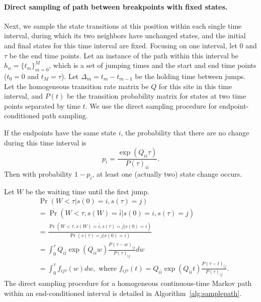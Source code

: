 \documentclass[11pt]{article}
\begin{document}
\paragraph{Direct sampling of path between breakpoints with fixed states.}
Next, we sample the state transitions at this position within each
single time interval, during which its two neighbors have unchanged
states, and the initial and final states for this time interval are
fixed.  Focusing on one interval, let $0$ and $\tau$ be the end time
points.  Let an instance of the path within this interval be $h_n=
\{t_m\}_{m=0}^{M}$, which is a set of jumping times and the start and
end time points ($t_0 = 0$ and $t_M=\tau$). Let $\Delta_m = t_m -
t_{m-1}$ be the holding time between jumps. Let the homogeneous
transition rate matrix be $Q$ for this site in this time interval, and
$P(t)$ be the transition probability matrix for states at two time
points separated by time $t$. We use the direct sampling procedure
\cite{hobolth2009simulation} for endpoint-conditioned path sampling.

If the endpoints have the same state $i$, the probability that there
are no change during this time interval is
\begin{equation} \label{eqn:pnojump}
p_i = \frac{\exp(Q_{ii}\tau)}{P(\tau)_{ii}}.
\end{equation}
Then with probability $1-p_i$, at least one (actually two) state change occurs.

Let $W$ be the waiting time until the first jump.
\begin{equation}
\begin{aligned}
& \Pr(W < \tau | s(0) = i, s(\tau) = j)  \\
& =  \Pr(W < \tau, s(W) = \bar{i} | s(0) = i, s(\tau) = j)\\
& = \frac{\Pr(W < \tau, s(W) = \bar{i},s(\tau) = j | s(0) = i) } {\Pr(s(\tau) = j | s(0) = i)}  \\
& = \int_{0}^{\tau} Q_{i\bar{i}} \exp(Q_{ii}w) \frac{P(\tau-w)_{\bar{i}j}}{P(\tau)_{ij}} dw \\
& = \int_{0}^{\tau} f_{ij\tau}(w) dw, \text{~where~}
f_{ij\tau}(t) = Q_{i\bar{i}} \exp(Q_{ii}t) \frac{P(\tau-t)_{\bar{i}j}}{P(\tau)_{ij}}.
\end{aligned}
\end{equation}
The direct sampling procedure for a homogeneous continuous-time Markov
path within an end-conditioned interval is detailed in
Algorithm~\ref{alg:samplepath}.
\end{document}
